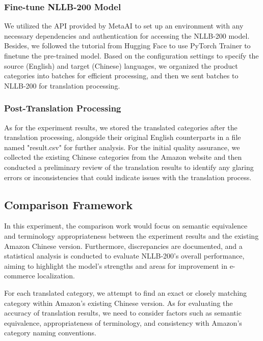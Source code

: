\documentclass[sigconf]{acmart}
\begin{document}
\subsubsection{Fine-tune NLLB-200 Model}
We utilized the API provided by MetaAI to set up an environment with any necessary dependencies and authentication for accessing the NLLB-200 model. Besides, we followed the tutorial from Hugging Face to use PyTorch Trainer to finetune the pre-trained model\cite{Hugging_Face}. Based on the configuration settings to specify the source (English) and target (Chinese) languages, we organized the product categories into batches for efficient processing, and then we sent batches to NLLB-200 for translation processing.

\subsubsection{Post-Translation Processing}
As for the experiment results, we stored the translated categories after the translation processing, alongside their original English counterparts in a file named "result.csv" for further analysis. For the initial quality assurance, we collected the existing Chinese categories from the Amazon website and then conducted a preliminary review of the translation results to identify any glaring errors or inconsistencies that could indicate issues with the translation process.


\subsection{Comparison Framework}
In this experiment, the comparison work would focus on semantic equivalence and terminology appropriateness between the experiment results and the existing Amazon Chinese version. Furthermore, discrepancies are documented, and a statistical analysis is conducted to evaluate NLLB-200's overall performance, aiming to highlight the model's strengths and areas for improvement in e-commerce localization.

For each translated category, we attempt to find an exact or closely matching category within Amazon's existing Chinese version. As for evaluating the accuracy of translation results, we need to consider factors such as semantic equivalence, appropriateness of terminology, and consistency with Amazon's category naming conventions.
\end{document}
